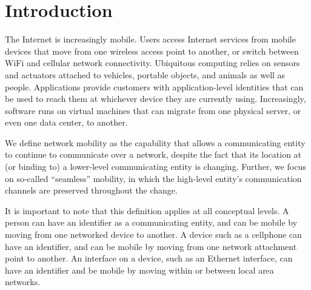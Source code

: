 \section{Introduction}
\label{sec:sec1}

The Internet is increasingly mobile.  
Users access Internet services from mobile devices that move from one
wireless access point to another, or switch between WiFi and cellular 
network connectivity.  
Ubiquitous computing relies on sensors and actuators attached to vehicles,
portable objects, and animals as well as people.
Applications 
provide customers with application-level identities that can be
used to reach them at whichever device they are currently using.
Increasingly, software runs on virtual machines that can migrate from one
physical server, or even one data center, to another.

We define network
mobility as the capability that allows a communicating entity
to continue to communicate over a network, despite the fact that its
location at (or binding to) a lower-level communicating entity is changing.
Further, we focus on so-called ``seamless'' mobility, in which the
high-level entity's communication channels are preserved throughout
the change.

It is important to note that this definition applies at all conceptual
levels.
A person can have an identifier as a communicating entity, and can be
mobile by moving from one networked device to another.
A device such as a
cellphone can have an identifier, and can be mobile by moving from one
network attachment point to another.
An interface on a device, such as an Ethernet interface, can have an
identifier and be mobile by moving within or between local area networks.

